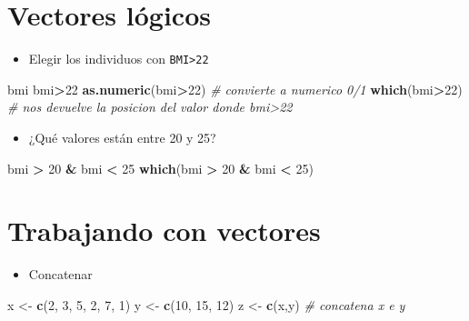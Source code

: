 \documentclass[]{book}
\newenvironment{Shaded}{\begin{snugshade}}{\end{snugshade}}
\newcommand{\KeywordTok}[1]{\textcolor[rgb]{0.13,0.29,0.53}{\textbf{#1}}}
\newcommand{\DecValTok}[1]{\textcolor[rgb]{0.00,0.00,0.81}{#1}}
\newcommand{\StringTok}[1]{\textcolor[rgb]{0.31,0.60,0.02}{#1}}
\newcommand{\CommentTok}[1]{\textcolor[rgb]{0.56,0.35,0.01}{\textit{#1}}}
\newcommand{\OperatorTok}[1]{\textcolor[rgb]{0.81,0.36,0.00}{\textbf{#1}}}
\newcommand{\NormalTok}[1]{#1}
\providecommand{\tightlist}{%
  \setlength{\itemsep}{0pt}\setlength{\parskip}{0pt}}
\begin{document}
\section{Vectores lógicos}\label{vectores-logicos}

\begin{itemize}
\tightlist
\item
  Elegir los individuos con \texttt{BMI\textgreater{}22}
\end{itemize}

\begin{Shaded}
\begin{Highlighting}[]
\NormalTok{bmi}
\NormalTok{bmi}\OperatorTok{>}\DecValTok{22}
\KeywordTok{as.numeric}\NormalTok{(bmi}\OperatorTok{>}\DecValTok{22}\NormalTok{) }\CommentTok{# convierte a numerico 0/1}
\KeywordTok{which}\NormalTok{(bmi}\OperatorTok{>}\DecValTok{22}\NormalTok{)  }\CommentTok{# nos devuelve la posicion del valor donde bmi>22}
\end{Highlighting}
\end{Shaded}

\begin{itemize}
\tightlist
\item
  ¿Qué valores están entre 20 y 25?
\end{itemize}

\begin{Shaded}
\begin{Highlighting}[]
\NormalTok{bmi }\OperatorTok{>}\StringTok{ }\DecValTok{20} \OperatorTok{&}\StringTok{ }\NormalTok{bmi }\OperatorTok{<}\StringTok{ }\DecValTok{25}
\KeywordTok{which}\NormalTok{(bmi }\OperatorTok{>}\StringTok{ }\DecValTok{20} \OperatorTok{&}\StringTok{ }\NormalTok{bmi }\OperatorTok{<}\StringTok{ }\DecValTok{25}\NormalTok{)}
\end{Highlighting}
\end{Shaded}

\section{Trabajando con vectores}\label{trabajando-con-vectores}

\begin{itemize}
\tightlist
\item
  Concatenar
\end{itemize}

\begin{Shaded}
\begin{Highlighting}[]
\NormalTok{x <-}\StringTok{ }\KeywordTok{c}\NormalTok{(}\DecValTok{2}\NormalTok{, }\DecValTok{3}\NormalTok{, }\DecValTok{5}\NormalTok{, }\DecValTok{2}\NormalTok{, }\DecValTok{7}\NormalTok{, }\DecValTok{1}\NormalTok{)}
\NormalTok{y <-}\StringTok{ }\KeywordTok{c}\NormalTok{(}\DecValTok{10}\NormalTok{, }\DecValTok{15}\NormalTok{, }\DecValTok{12}\NormalTok{)}
\NormalTok{z <-}\StringTok{ }\KeywordTok{c}\NormalTok{(x,y)  }\CommentTok{# concatena x e y}
\end{Highlighting}
\end{Shaded}
\end{document}
